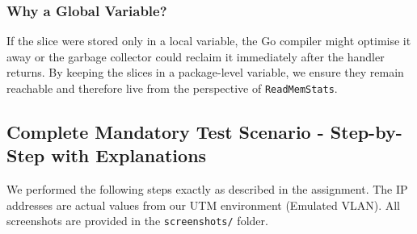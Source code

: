 \documentclass[a4paper]{article}
\begin{document}
\subsubsection{Why a Global Variable?}
If the slice were stored only in a local variable, the Go compiler might optimise it away or the garbage collector could reclaim it immediately after the handler returns. By keeping the slices in a package-level variable, we ensure they remain reachable and therefore live from the perspective of \texttt{ReadMemStats}.

\subsection{Complete Mandatory Test Scenario - Step-by-Step with Explanations}
We performed the following steps exactly as described in the assignment. The IP addresses are actual values from our UTM environment (Emulated VLAN). All screenshots are provided in the \texttt{screenshots/} folder.
\end{document}

